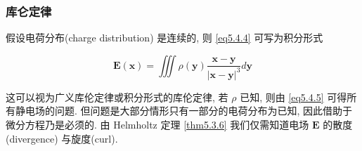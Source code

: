 \documentclass[aspectratio=2516]{beamer}
\begin{document}

\begin{frame}
\frametitle{\kaishu 库仑定律}

\kaishu

假设电荷分布(charge distribution) 是连续的, 则 \ref{eq5.4.4} 可写为积分形式

\vspace{0.75cm }

\begin{equation}
\boldsymbol{E}\left( \boldsymbol{x} \right) = \iiint {\rho \left( \boldsymbol{y} \right)\frac{{\boldsymbol{x} - \boldsymbol{y}}}{{{{\left| {\boldsymbol{x} - \boldsymbol{y}} \right|}^3}}}d\boldsymbol{y}}
\label{eq5.4.5}
\end{equation}

\vspace{0.75cm }

这可以视为广义库伦定律或积分形式的库伦定律, 若 $ \rho $ 已知, 则由 \ref{eq5.4.5} 可得所有静电场的问题. 但问题是大部分情形只有一部分的电荷分布为已知, 因此借助于微分方程乃是必须的. 由  Helmholtz 定理 \ref{thm5.3.6} 我们仅需知道电场 $ \boldsymbol{E} $ 的散度(divergence) 与旋度(curl). 

\end{frame}

\end{document}
